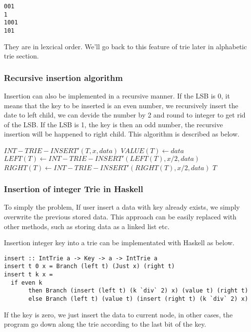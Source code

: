 \documentclass{article}
\begin{document}
\begin{verbatim}
001
1
1001
101
\end{verbatim}

They are in lexcical order. We'll go back to this feature of trie later in 
alphabetic trie section.

\subsubsection{Recursive insertion algorithm}
Insertion can also be implemented in a recursive manner. If the LSB is 0, it 
means that the key to be inserted is an even number, we recursively insert the
date to left child, we can devide the number by 2 and round to integer to get
rid of the LSB. If the LSB is 1, the key is then an odd number, the recursive
insertion will be happened to right child. This algorithm is described as below.

\begin{algorithmic}
\STATE $INT-TRIE-INSERT'(T, x, data)$
    \STATE $VALUE(T) \leftarrow data$
  \ELSE
      \STATE $LEFT(T) \leftarrow INT-TRIE-INSERT'(LEFT(T), x/2, data)$
    \ELSE
      \STATE $RIGHT(T) \leftarrow INT-TRIE-INSERT'(RIGHT(T), x/2, data)$
    \ENDIF
  \ENDIF
  \RETURN $T$
\end{algorithmic}

\subsubsection*{Insertion of integer Trie in Haskell}
To simply the problem, If user insert a data with key already exists, we simply
overwrite the previous stored data. This approach can be easily replaced with 
other methods, such as storing data as a linked list etc.

Insertion integer key into a trie can be implementated with Haskell as below.

\lstset{language=Haskell}
\begin{lstlisting}
insert :: IntTrie a -> Key -> a -> IntTrie a
insert t 0 x = Branch (left t) (Just x) (right t)
insert t k x = 
  if even k
       then Branch (insert (left t) (k `div` 2) x) (value t) (right t)
       else Branch (left t) (value t) (insert (right t) (k `div` 2) x)
\end{lstlisting}

If the key is zero, we just insert the data to current node, in other
cases, the program go down along the trie according to the last bit
of the key.
\end{document}
